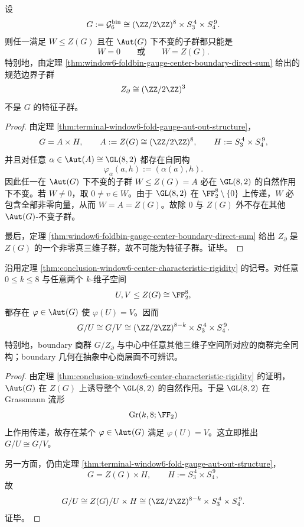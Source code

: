 \begin{theorem}\label{thm:conclusion-window6-center-characteristic-rigidity}
设
\[
G:=\mathcal G_6^{\mathrm{bin}}
\cong
(\ZZ/2\ZZ)^8\times S_3^{\,4}\times S_4^{\,9}.
\]
则任一满足 \(W\le Z(G)\) 且在 \(\Aut(G)\) 下不变的子群都只能是
\[
W=0
\qquad\text{或}\qquad
W=Z(G).
\]
特别地，由定理 \ref{thm:window6-foldbin-gauge-center-boundary-direct-sum} 给出的规范边界子群
\[
Z_{\partial}\cong (\ZZ/2\ZZ)^3
\]
不是 \(G\) 的特征子群。
\end{theorem}
\begin{proof}
由定理 \ref{thm:terminal-window6-fold-gauge-aut-out-structure}，
\[
G=A\times H,
\qquad
A:=Z(G)\cong (\ZZ/2\ZZ)^8,
\qquad
H:=S_3^{\,4}\times S_4^{\,9},
\]
并且对任意 \(\alpha\in\Aut(A)\cong \GL(8,2)\) 都存在自同构
\[
\varphi_\alpha(a,h):=(\alpha(a),h).
\]
因此任一在 \(\Aut(G)\) 下不变的子群 \(W\le Z(G)=A\) 必在 \(\GL(8,2)\) 的自然作用下不变。若 \(W\neq 0\)，取 \(0\neq v\in W\)。由于 \(\GL(8,2)\) 在 \(\FF_2^8\setminus\{0\}\) 上传递，\(W\) 必包含全部非零向量，从而 \(W=A=Z(G)\)。故除 \(0\) 与 \(Z(G)\) 外不存在其他 \(\Aut(G)\)-不变子群。

最后，定理 \ref{thm:window6-foldbin-gauge-center-boundary-direct-sum} 给出 \(Z_{\partial}\) 是 \(Z(G)\) 的一个非零真三维子群，故不可能为特征子群。证毕。
\end{proof}

\begin{corollary}\label{cor:conclusion-window6-center-quotient-grassmann-collapse}
沿用定理 \ref{thm:conclusion-window6-center-characteristic-rigidity} 的记号。对任意 \(0\le k\le 8\) 与任意两个 \(k\)-维子空间
\[
U,V\le Z(G)\cong \FF_2^8,
\]
都存在 \(\varphi\in \Aut(G)\) 使 \(\varphi(U)=V\)。因而
\[
G/U\cong G/V\cong (\ZZ/2\ZZ)^{8-k}\times S_3^{\,4}\times S_4^{\,9}.
\]
特别地，boundary 商群 \(G/Z_{\partial}\) 与中心中任意其他三维子空间所对应的商群完全同构；boundary 几何在抽象中心商层面不可辨识。
\end{corollary}
\begin{proof}
由定理 \ref{thm:conclusion-window6-center-characteristic-rigidity} 的证明，\(\Aut(G)\) 在 \(Z(G)\) 上诱导整个 \(\GL(8,2)\) 的自然作用。于是 \(\GL(8,2)\) 在 Grassmann 流形
\[
\mathrm{Gr}(k,8;\FF_2)
\]
上作用传递，故存在某个 \(\varphi\in\Aut(G)\) 满足 \(\varphi(U)=V\)。这立即推出 \(G/U\cong G/V\)。

另一方面，仍由定理 \ref{thm:terminal-window6-fold-gauge-aut-out-structure}，
\[
G=Z(G)\times H,
\qquad
H:=S_3^{\,4}\times S_4^{\,9},
\]
故
\[
G/U\cong Z(G)/U\times H\cong (\ZZ/2\ZZ)^{8-k}\times S_3^{\,4}\times S_4^{\,9}.
\]
证毕。
\end{proof}


